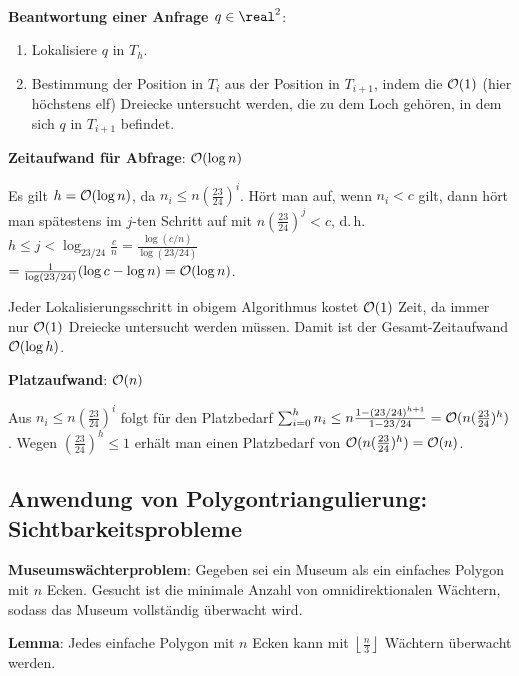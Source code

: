 \linie\
\pagebreak


\textbf{Beantwortung einer Anfrage $q \in \real^2$}:
\begin{enumerate}
    \item
    Lokalisiere $q$ in $T_h$.

    \item
    Bestimmung der Position in $T_i$ aus der Position in $T_{i+1}$, indem die $\mathcal{O}(1)$
    (hier höchstens elf) Dreiecke untersucht werden, die zu dem Loch gehören, in dem sich
    $q$ in $T_{i+1}$ befindet.
\end{enumerate}

\textbf{Zeitaufwand für Abfrage}:
$\mathcal{O}(\log n)$

\begin{Beweis}
    Es gilt $h = \mathcal{O}(\log n)$, da $n_i \le n (\frac{23}{24})^i$.
    Hört man auf, wenn $n_i < c$ gilt, dann hört man spätestens im $j$-ten Schritt auf mit
    $n (\frac{23}{24})^j < c$, d.\,h.
    $h \le j < \log_{23/24} \frac{c}{n}
    = \frac{\log(c/n)}{\log(23/24)}$\\
    $= \frac{1}{\log(23/24)} (\log c - \log n) = \mathcal{O}(\log n)$.

    Jeder Lokalisierungsschritt in obigem Algorithmus kostet $\mathcal{O}(1)$ Zeit,
    da immer nur $\mathcal{O}(1)$ Dreiecke untersucht werden müssen.
    Damit ist der Gesamt-Zeitaufwand $\mathcal{O}(\log h)$.
\end{Beweis}

\textbf{Platzaufwand}:
$\mathcal{O}(n)$

\begin{Beweis}
    Aus $n_i \le n (\frac{23}{24})^i$ folgt für den Platzbedarf
    $\sum_{i=0}^{h} n_i
    \le n \frac{1 - (23/24)^{h+1}}{1 - 23/24}
    = \mathcal{O}(n (\frac{23}{24})^h)$.
    Wegen $(\frac{23}{24})^h \le 1$
    erhält man einen Platzbedarf von $\mathcal{O}(n (\frac{23}{24})^h) = \mathcal{O}(n)$.
\end{Beweis}

\subsection{%
    Anwendung von Polygontriangulierung: Sichtbarkeitsprobleme%
}

\textbf{Museumswächterproblem}:
Gegeben sei ein Museum als ein einfaches Polygon mit $n$ Ecken.
Gesucht ist die minimale Anzahl von omnidirektionalen Wächtern, sodass das Museum vollständig
überwacht wird.

\textbf{Lemma}:
Jedes einfache Polygon mit $n$ Ecken kann mit
$\left\lfloor \frac{n}{3} \right\rfloor$ Wächtern überwacht werden.

